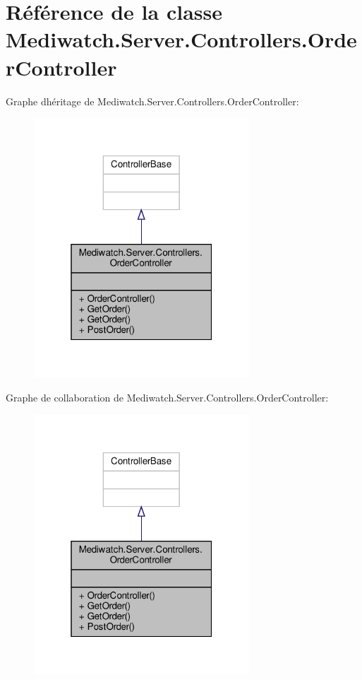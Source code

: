\hypertarget{class_mediwatch_1_1_server_1_1_controllers_1_1_order_controller}{}\section{Référence de la classe Mediwatch.\+Server.\+Controllers.\+Order\+Controller}
\label{class_mediwatch_1_1_server_1_1_controllers_1_1_order_controller}


Graphe d\textquotesingle{}héritage de Mediwatch.\+Server.\+Controllers.\+Order\+Controller\+:
\nopagebreak
\begin{figure}[H]
\begin{center}
\leavevmode
\includegraphics[width=229pt]{class_mediwatch_1_1_server_1_1_controllers_1_1_order_controller__inherit__graph}
\end{center}
\end{figure}


Graphe de collaboration de Mediwatch.\+Server.\+Controllers.\+Order\+Controller\+:
\nopagebreak
\begin{figure}[H]
\begin{center}
\leavevmode
\includegraphics[width=229pt]{class_mediwatch_1_1_server_1_1_controllers_1_1_order_controller__coll__graph}
\end{center}
\end{figure}
